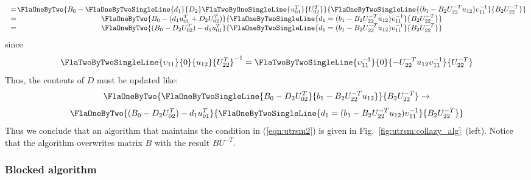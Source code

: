 \begin{eqnarray*}
\begin{array}{c @{\hspace{1pt}} c @{\hspace{1pt}} c @{\hspace{1pt}} c @{\hspace{1pt}} c}
&=&
\FlaOneByTwo { B_0 -
               \FlaOneByTwoSingleLine{ d_1 } { D_2 }
               \FlaTwoByOneSingleLine{ u_{01}^T  } 
                                     { U_{02}^T  } }
             {
               \FlaOneByTwoSingleLine { ( b_1 - B_{2}U_{22}^{-T}u_{12} ) \upsilon_{11}^{-1} }
                                      { B_{2} U_{22}^{-T} } } \\
&=&
\FlaOneByTwo { B_0 - ( d_{1} u_{01}^{T} + D_{2} U_{02}^{T} ) }
             {
               \FlaOneByTwoSingleLine { d_1 = ( b_1 - B_{2}U_{22}^{-T}u_{12} ) \upsilon_{11}^{-1} }
                                      { B_{2} U_{22}^{-T} } } \\
&=&
\FlaOneByTwo { ( B_0 - D_{2} U_{02}^{T} ) - d_{1} u_{01}^{T} }
             {
               \FlaOneByTwoSingleLine { d_1 = ( b_1 - B_{2}U_{22}^{-T}u_{12} ) \upsilon_{11}^{-1} }
                                      { B_{2}U_{22}^{-T} } } \\
\end{array}
\end{eqnarray*}
since 
\[
            \FlaTwoByTwoSingleLine{ \upsilon_{11} } {    0     }
                                  {     u_{12}    } { U_{22}^T }^{-1}
=
            \FlaTwoByTwoSingleLine{ \upsilon_{11}^{-1}                     } {       0     }
                                  { -U_{22}^{-T} u_{12} \upsilon_{11}^{-1} } { U_{22}^{-T} }
\]
Thus, the contents of $ D $ must be updated like:
\begin{equation}
\FlaOneByTwo{ \FlaOneByTwoSingleLine{ B_0 - D_{2}U_{02}^T }
                                    { b_1 -  B_{2}U_{22}^{-T}u_{12}   } }
	    { B_{2}U_{22}^{-T} }
\rightarrow
\end{equation}
\[
\FlaOneByTwo { ( B_0 - D_{2} U_{02}^{T} ) - d_{1} u_{01}^{T} }
             {
               \FlaOneByTwoSingleLine { d_1 = ( b_1 - B_{2} U_{22}^{-T} u_{12} ) \upsilon_{11}^{-1} }
                                      { B_{2} U_{22}^{-T} } } \\
\]
Thus we conclude that
an algorithm that maintains the condition in (\ref{eqn:utrsm2}) is
given in Fig.~\ref{fig:utrsm:collazy_alg}~(left).
Notice that the algorithm overwrites matrix $ B $ with the
result $ B U^{-T} $.

\subsubsection{Blocked algorithm}

